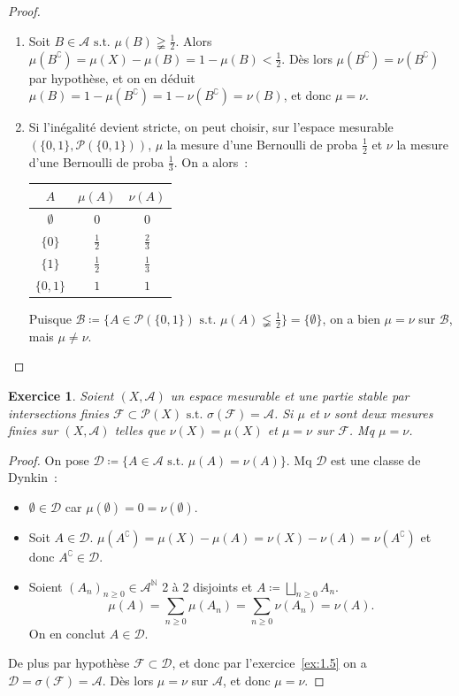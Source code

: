 \documentclass{article}
\newtheorem{ex}{Exercice}[section]
\newcommand{\st}{\text{ s.t. }}
\newcommand{\C}{\complement}
\newcommand{\N}{{\mathbb N}}
\begin{document}
\begin{proof}~
\begin{enumerate}
	\item Soit $B \in \mathcal A \st \mu(B) \gneqq \frac 12$. Alors $\mu(B^\C) = \mu(X) - \mu(B) = 1 - \mu(B) < \frac 12$. Dès lors $\mu(B^\C) = \nu(B^\C)$ par hypothèse,
	et on en déduit $\mu(B) = 1 - \mu(B^\C) = 1 - \nu(B^\C) = \nu(B)$, et donc $\mu = \nu$.
	\item Si l'inégalité devient stricte, on peut choisir, sur l'espace mesurable $(\{0, 1\}, \mathcal P(\{0, 1\}))$, $\mu$ la mesure d'une Bernoulli de proba
	$\frac 12$ et $\nu$ la mesure d'une Bernoulli de proba $\frac 13$. On a alors~:

	\begin{tabular}{c|c|c}
		$A$ & $\mu(A)$ & $\nu(A)$ \\
		\hline
		$\emptyset$ & $0$ & $0$ \\
		$\{0\}$ & $\frac 12$ & $\frac 23$ \\
		$\{1\}$ & $\frac 12$ & $\frac 13$ \\
		$\{0, 1\}$ & $1$ & $1$
	\end{tabular}

	Puisque $\mathcal B \coloneqq \{A \in \mathcal P(\{0, 1\}) \st \mu(A) \lneqq \frac 12\} = \{\emptyset\}$, on a bien $\mu = \nu$ sur $\mathcal B$, mais $\mu \neq \nu$.
\end{enumerate}
\end{proof}

\begin{ex} Soient $(X, \mathcal A)$ un espace mesurable et une partie stable par intersections finies $\mathcal F \subset \mathcal P(X) \st \sigma(\mathcal F) = \mathcal A$.
Si $\mu$ et $\nu$ sont deux mesures finies sur $(X, \mathcal A)$ telles que $\nu(X) = \mu(X)$ et $\mu = \nu$ sur $\mathcal F$. Mq $\mu = \nu$.
\end{ex}

\begin{proof} On pose $\mathcal D \coloneqq \{A \in \mathcal A \st \mu(A) = \nu(A)\}$. Mq $\mathcal D$ est une classe de Dynkin~:
\begin{itemize}
	\item $\emptyset \in \mathcal D$ car $\mu(\emptyset) = 0 = \nu(\emptyset)$.
	\item Soit $A \in \mathcal D$. $\mu(A^\C) = \mu(X) - \mu(A) = \nu(X) - \nu(A) = \nu(A^\C)$ et donc $A^\C \in \mathcal D$.
	\item Soient $(A_n)_{n \geq 0} \in {\mathcal A}^\N$ 2 à 2 disjoints et $A \coloneqq \bigsqcup_{n \geq 0}A_n$.
	\[\mu(A) = \sum_{n \geq 0}\mu(A_n) = \sum_{n \geq 0}\nu(A_n) = \nu(A).\]
	On en conclut $A \in \mathcal D$.
\end{itemize}

De plus par hypothèse $\mathcal F \subset \mathcal D$, et donc par l'exercice~\ref{ex:1.5} on a $\mathcal D = \sigma(\mathcal F) = \mathcal A$. Dès lors $\mu = \nu$ sur $\mathcal A$,
et donc $\mu = \nu$.
\end{proof}
\end{document}
